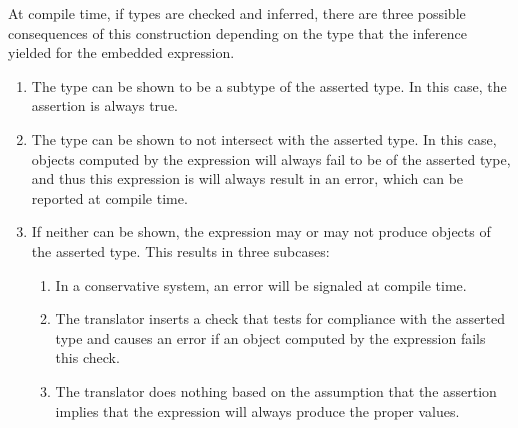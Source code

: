 \egr

At compile time, if types are
checked and inferred, there are three possible consequences of this
construction depending on the type that the inference yielded for the
embedded expression.
\begin{enumerate}
\item The type can be shown to be a subtype of the asserted type. In
  this case, the assertion is always true.
\item The type can be shown to not intersect with the asserted
  type. In this case, objects computed by the expression will always
  fail to be of the asserted type, and thus this expression is will
  always result in an error, which can be reported at compile time.
\item If neither can be shown, the expression may or may not produce
  objects of the asserted type. This results in three subcases:
  \begin{enumerate}
  \item In a conservative system, an error will be signaled at compile
    time.
  \item {}The translator inserts a check that tests for compliance with
    the asserted type and causes an error if an object computed by the
    expression fails this check.
  \item The translator does nothing based on the assumption that the
    assertion implies that the expression will always produce the
    proper values.
  \end{enumerate}
\end{enumerate}







